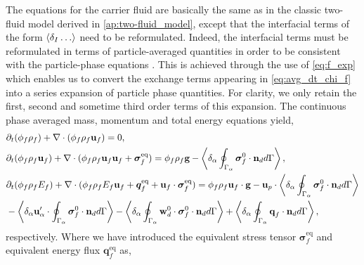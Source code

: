 The equations for the carrier fluid are basically the same as in the classic two-fluid model derived in \ref{ap:two-fluid_model}, except that the interfacial terms of the form $\left<\delta_I \ldots \right>$ need to be reformulated.
Indeed, the interfacial terms must be reformulated in terms of particle-averaged quantities in order to be consistent with the particle-phase equations \citep{jackson1997locally,zhang1994averaged}. 
This is achieved through the use of \ref{eq:f_exp} which enables us to convert the exchange terms appearing in \ref{eq:avg_dt_chi_f} into a series expansion of particle phase quantities. 
For clarity, we only retain the first, second and sometime third order terms of this expansion. 
The continuous phase averaged mass, momentum and total energy equations yield, 
\begin{align}
    \label{eq:dt_hybrid_rho}
    &\partial_t (\phi_f \rho_f)  
    + \mathbf{\nabla}\cdot (
        \phi_f \rho_f\textbf{u}_f
    )
    = 
    0,\\
    \label{eq:dt_hybrid_rhou_f}
    &\partial_t (\phi_f \rho_f\textbf{u}_f)  
    + \mathbf{\nabla}\cdot (
        \phi_f \rho_f\textbf{u}_f\textbf{u}_f
        + \bm{\sigma}_f^\text{eq}
    )
    = 
    \phi_f \rho_f \textbf{g} 
    - \left<\delta_\alpha \oint_{\Gamma_\alpha} {\bm{\sigma}_f^0 \cdot \textbf{n}_d} d\Gamma\right>,
    \\
    \label{eq:dt_hybrid_rhoE_f}
    &\partial_t (\phi_f\rho_fE_f)  
    + \mathbf{\nabla}\cdot (
        \phi_f\rho_fE_f\textbf{u}_f
        + \bm{q}_f^\text{eq}
        + \textbf{u}_f \cdot \bm{\sigma}_f^\text{eq}
        )
    = 
    \phi_f \rho_f\textbf{u}_f \cdot \textbf{g} 
    - \textbf{u}_p \cdot \left<\delta_\alpha \oint_{\Gamma_\alpha} {\bm{\sigma}_f^0 \cdot \textbf{n}_d} d\Gamma\right>\nonumber \\
    &- \left<\delta_\alpha  \textbf{u}_\alpha' \cdot \oint_{\Gamma_\alpha}   \bm{\sigma}_f^0 \cdot \textbf{n}_d d\Gamma\right>
    - \left<\delta_\alpha  \oint_{\Gamma_\alpha} \textbf{w}_d^0 \cdot \bm{\sigma}_f^0 \cdot \textbf{n}_d d\Gamma\right>
    + \left<\delta_\alpha \oint_{\Gamma_\alpha} {\textbf{q}_f\cdot \textbf{n}_d} d\Gamma\right>,
\end{align} 
respectively. 
Where we have introduced the equivalent stress tensor $\bm{\sigma}_f^\text{eq}$ and equivalent energy flux $\textbf{q}^\text{eq}_f$ as,
